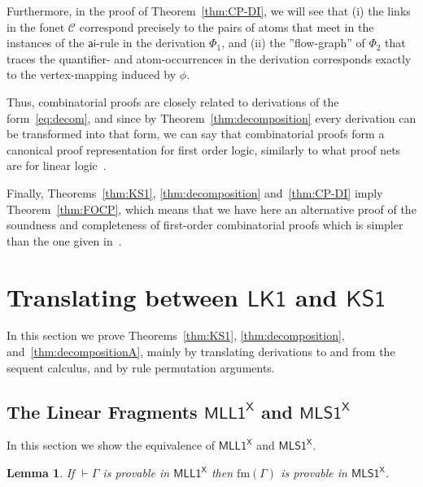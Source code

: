 \documentclass[conference,twosided,10pt]{IEEEtran}
\newtheorem{lemma}[thm]{Lemma}
\theoremstyle{definition}
\newcommand{\graph}[1]{\mathcal{#1}}
\newcommand{\gC}{\graph{C}}
\newcommand{\Deri}{\Phi}
\newcommand*{\FOLK}{\mathsf{LK1}}
\newcommand*{\FOMLL}{\mathsf{MLL1^X}}
\newcommand*{\FOKS}{\mathsf{KS1}}
\newcommand*{\FOMLS}{\mathsf{MLS1^X}}
\newcommand\aiD {\mathsf{ai}}
\newcommand{\sqn}[1]{\vdash#1}
\newcommand{\form}[1]{\mathrm{fm}(#1)}
\begin{document}
Furthermore, in the proof of Theorem~\ref{thm:CP-DI}, we will see that
(i) the links in the fonet $\gC$ correspond precisely to the pairs of
atoms that meet in the instances of the $\aiD$-rule in the derivation
$\Deri_1$, and (ii) the ''flow-graph'' of $\Deri_2$ that traces the
quantifier- and atom-occurrences in the derivation corresponds exactly
to the vertex-mapping induced by $\phi$.

Thus, combinatorial proofs are closely related to derivations of the
form~\eqref{eq:decom}, and since by Theorem~\ref{thm:decomposition}
every derivation can be transformed into that form, we can say that
combinatorial proofs form a canonical proof representation for first
order logic, similarly to what proof nets are for linear
logic~\cite{girard:96:PN}.

Finally, Theorems~\ref{thm:KS1}, \ref{thm:decomposition}
and~\ref{thm:CP-DI} imply Theorem~\ref{thm:FOCP}, which means that we
have here an alternative proof of the soundness and completeness of
first-order combinatorial proofs which is simpler than the one given
in~\cite{hughes:fopws}.




\section{Translating between $\FOLK$ and $\FOKS$}

In this section we prove Theorems~\ref{thm:KS1},
\ref{thm:decomposition}, and~\ref{thm:decompositionA}, mainly by
translating derivations to and from the sequent calculus, and by rule
permutation arguments.

\subsection{The Linear Fragments $\FOMLL$ and $\FOMLS$}

In this section we show the equivalence of $\FOMLL$ and $\FOMLS$.

\begin{lemma}\label{lem:MLL1->MLS1}
  If $\sqn\Gamma$ is provable in $\FOMLL$ then $\form\Gamma$ is provable in  $\FOMLS$.
\end{lemma}
\end{document}
